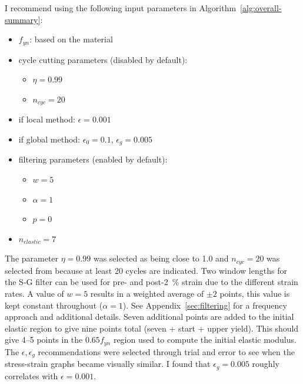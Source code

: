 \documentclass[a4paper,11pt]{article}
\begin{document}
I recommend using the following input parameters in Algorithm~\ref{alg:overall-summary}:
\begin{itemize}
    \item $f_{yn}$: based on the material
    \item cycle cutting parameters (disabled by default):
    \begin{itemize}
        \item $\eta = 0.99$
        \item $n_{cyc} = 20$
    \end{itemize}
    \item if local method: $\epsilon = 0.001$
    \item if global method: $\epsilon_0 = 0.1$, $\epsilon_g = 0.005$
    \item filtering parameters (enabled by default):
    \begin{itemize}
        \item $w = 5$
        \item $\alpha = 1$
        \item $p = 0$
    \end{itemize}
    \item $n_{elastic} = 7$
\end{itemize}
The parameter $\eta = 0.99$ was selected as being close to 1.0 and $n_{cyc} = 20$ was selected from \citet{deCastroeSousaConsistencySolvingInverse2020} because at least 20 cycles are indicated.
Two window lengths for the S-G filter can be used for pre- and post-2~\% strain due to the different strain rates.
A value of $w = 5$ results in a weighted average of $\pm2$ points, this value is kept constant throughout ($\alpha = 1$).
See Appendix~\ref{sec:filtering} for a frequency approach and additional details.
Seven additional points are added to the initial elastic region to give nine points total (seven + start + upper yield).
This should give 4--5 points in the $0.65 f_{yn}$ region used to compute the initial elastic modulus.
The $\epsilon, \epsilon_g$ recommendations were selected through trial and error to see when the stress-strain graphs became visually similar.
I found that $\epsilon_g = 0.005$ roughly correlates with $\epsilon = 0.001$.
\end{document}
